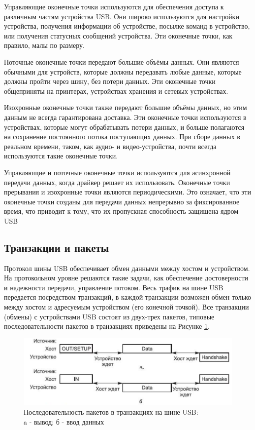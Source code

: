 Управляющие оконечные точки используются для обеспечения доступа к различным
частям устройства USB. Они широко используются для настройки устройства, получения
информации об устройстве, посылке команд в устройство, или получения статусных
сообщений устройства. Эти оконечные точки, как правило, малы по размеру.\par

Поточные оконечные точки передают большие объёмы данных. Они являются обычными для устройств, которые должны
передавать любые данные, которые должны пройти через шину, без потери данных.
Эти оконечные точки общеприняты на принтерах,
устройствах хранения и сетевых устройствах.\par

Изохронные оконечные точки также передают большие объёмы данных, но этим данным
не всегда гарантирована доставка. Эти оконечные точки используются в устройствах,
которые могут обрабатывать потери данных, и больше полагаются на сохранение
постоянного потока поступающих данных. При сборе данных в реальном времени, таком,
как аудио- и видео-устройства, почти всегда используются такие оконечные точки.
\par

Управляющие и поточные оконечные точки используются для асинхронной передачи
данных, когда драйвер решает их использовать. Оконечные точки прерывания и изохронные
точки являются периодическими. Это означает, что эти оконечные точки созданы для
передачи данных непрерывно за фиксированное время, что приводит к тому, что их пропускная
способность защищена ядром USB

\subsection{Транзакции и пакеты}
Протокол шины USB обеспечивает обмен данными между хостом и устройством. На протокольном уровне решаются такие задачи, как обеспечение достоверности и надежности передачи, управление потоком. Весь трафик на шине USB передается посредством транзакций, в каждой транзакции возможен обмен только между хостом и адресуемым устройством (его конечной точкой). Все транзакции (обмены) с устройствами USB состоят из двух-трех пакетов, типовые последовательности пакетов в транзакциях приведены на Рисунке \ref{packets}.\par

\begin{figure}[h!]
	\centering
	\includegraphics[scale=0.9]{img/packets.pdf}
	\caption{Последовательность пакетов в транзакциях на шине USB:\\
	a - вывод; б - ввод данных}
	\label{packets}
\end{figure}\par

